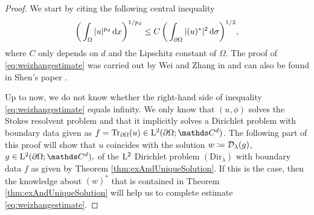 \begin{proof}
  We start by citing the following central inequality
  \begin{align}
    \label{eq:weizhangestimate}
    \bigg( \int_\Omega |u|^{p_d} \, {\operatorname{d}\!{x}} \bigg)^{1/{p_d}} \leq C\, \bigg( \int_{\partial\Omega} |(u)^*|^2 \, {\operatorname{d}\!{\sigma}} \bigg)^{1/2},
  \end{align}
  where $C$ only depends on $d$ and the Lipschitz constant of $\Omega$.
  The proof of \eqref{eq:weizhangestimate} was carried out by Wei and Zhang in \cite[Lem.\@~3.3]{weiZhang} and can also be found in Shen's paper \cite[p.\@~418f.]{Shen2012}.

  Up to now, we do not know whether the right-hand side of inequality \eqref{eq:weizhangestimate}  equals infinity.
  We only know that $(u,\phi)$ solves the Stokes resolvent problem and that it implicitly solves a Dirichlet problem with boundary data given as $f = \operatorname{Tr}_{\partial\Omega} (u) \in \Ell^2(\partial\Omega; \C^d)$.
  The following part of this proof will show that $u$ coincides with the solution $w \coloneqq \mathcal{D}_\lambda(g)$, $g \in \Ell^2(\partial\Omega; \C^d),$  of the $\mathrm{L}^2$ Dirichlet problem \hyperref[eq:dirProblem]{$(\mathrm{Dir}_\lambda)$} with boundary data $f$ as given by Theorem \ref{thm:exAndUniqueSolution}. 
  If this is the case, then the knowledge about $(w)^*$ that is contained in Theorem \ref{thm:exAndUniqueSolution} will help us to complete estimate \eqref{eq:weizhangestimate}.


\end{proof}
